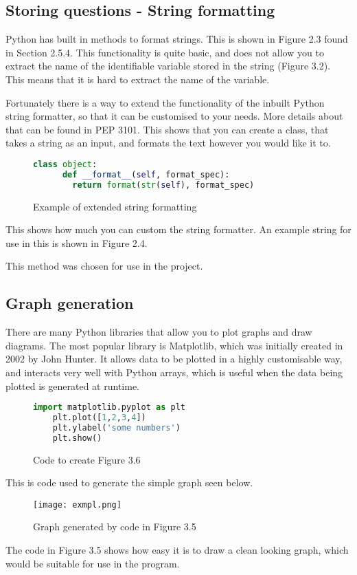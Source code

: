\subsection{Storing questions - String formatting}
Python has built in methods to format strings. This is shown in Figure 2.3 found in Section 2.5.4. This functionality is quite basic, and does not allow you to extract the name of the identifiable variable stored in the string (Figure 3.2). This means that it is hard to extract the name of the variable.

Fortunately there is a way to extend the functionality of the inbuilt Python string formatter, so that it can be customised to your needs. More details about that can be found in PEP 3101\autocite{pep3101}. This shows that you can create a class, that takes a string as an input, and formats the text however you would like it to. 

\begin{figure}[H]
\begin{lstlisting}[language=Python,]
	class object:
	  def __format__(self, format_spec):
	    return format(str(self), format_spec)
\end{lstlisting}
\caption{Example of extended string formatting\autocite{pep3101}}
\end{figure}

This shows how much you can custom the string formatter. An example string for use in this is shown in Figure 2.4.

This method was chosen for use in the project.

\subsection{Graph generation}
There are many Python libraries that allow you to plot graphs and draw diagrams. The most popular library is Matplotlib, which was initially created in 2002 by John Hunter. It allows data to be plotted in a highly customisable way, and interacts very well with Python arrays, which is useful when the data being plotted is generated at runtime.

\begin{figure}[H]
	\centering
	\begin{lstlisting}[language=Python]
	import matplotlib.pyplot as plt
	plt.plot([1,2,3,4])
	plt.ylabel('some numbers')
	plt.show()
	\end{lstlisting}
	
	\caption{Code to create Figure 3.6 \autocite{mpl}}
\end{figure}
This is code used to generate the simple graph seen below.
\begin{figure}[H]
	\texttt{[image: exmpl.png]}
	\caption{Graph generated by code in Figure 3.5}
\end{figure}
The code in Figure 3.5 shows how easy it is to draw a clean looking graph, which would be suitable for use in the program.

